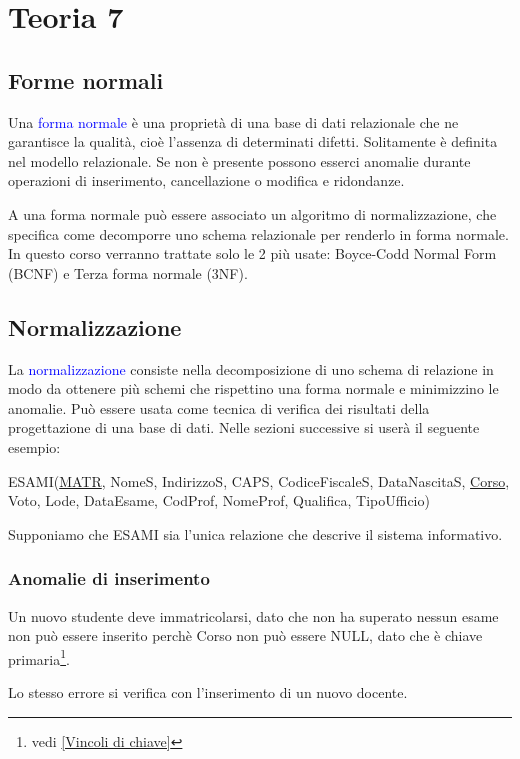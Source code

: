 \chapter{Teoria 7}

\section{Forme normali}

Una \textcolor{blue}{forma normale} è una proprietà di una base di dati relazionale che ne garantisce la qualità, cioè l’assenza di determinati difetti. Solitamente è definita nel modello relazionale. Se non è presente possono esserci anomalie durante operazioni di inserimento, cancellazione o modifica e ridondanze. 

A una forma normale può essere associato un algoritmo di normalizzazione, che specifica come decomporre uno schema relazionale per renderlo in forma normale. In questo corso verranno trattate solo le 2 più usate: Boyce-Codd Normal Form (BCNF) e Terza forma normale (3NF).

\section{Normalizzazione}

La \textcolor{blue}{normalizzazione} consiste nella decomposizione di uno schema di relazione in modo da ottenere più schemi che rispettino una forma normale e minimizzino le anomalie.
 Può essere usata come tecnica di verifica dei risultati della progettazione di una base di dati. Nelle sezioni successive si userà il seguente esempio: 

ESAMI(\underline{MATR}, NomeS, IndirizzoS, CAPS, CodiceFiscaleS, DataNascitaS, \underline{Corso}, Voto, Lode, DataEsame, CodProf, NomeProf, Qualifica, TipoUfficio)

Supponiamo che ESAMI sia l’unica relazione che descrive il sistema informativo.

\subsection{Anomalie di inserimento}

Un nuovo studente deve immatricolarsi, dato che non ha superato nessun esame non può essere inserito perchè Corso non può essere NULL, dato che è chiave primaria\footnote{vedi \ref{Vincoli di chiave}}.

Lo stesso errore si verifica con l'inserimento di un nuovo docente.

